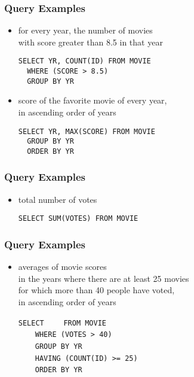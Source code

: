 \documentclass[dvipsnames]{beamer}
\theoremstyle{plain}
\begin{document}
\begin{frame}[fragile]
  \frametitle{Query Examples}

  \begin{itemize}
    \item for every year, the number of movies\\
      with score greater than 8.5 in that year
    \begin{lstlisting}
SELECT YR, COUNT(ID) FROM MOVIE
  WHERE (SCORE > 8.5)
  GROUP BY YR
    \end{lstlisting}

    \pause
    \item score of the favorite movie of every year,\\
      in ascending order of years
    \begin{lstlisting}
SELECT YR, MAX(SCORE) FROM MOVIE
  GROUP BY YR
  ORDER BY YR
    \end{lstlisting}
  \end{itemize}
\end{frame}

\begin{frame}[fragile]
  \frametitle{Query Examples}

  \begin{itemize}
    \item total number of votes
    \begin{lstlisting}
SELECT SUM(VOTES) FROM MOVIE
    \end{lstlisting}
  \end{itemize}
\end{frame}

\begin{frame}[fragile]
  \frametitle{Query Examples}

  \begin{itemize}
    \item averages of movie scores\\
      in the years where there are at least 25 movies\\
      for which more than 40 people have voted,\\
      in ascending order of years

\medskip
\lstinline!SELECT! 
~~~~\lstinline!FROM MOVIE!\\
\pause
~~~~\lstinline!WHERE (VOTES > 40)!\\
\pause
~~~~\lstinline!GROUP BY YR!\\
\pause
~~~~\lstinline!HAVING (COUNT(ID) >= 25)!\\
\pause\pause
~~~~\lstinline!ORDER BY YR!
  \end{itemize}
\end{frame}
\end{document}
